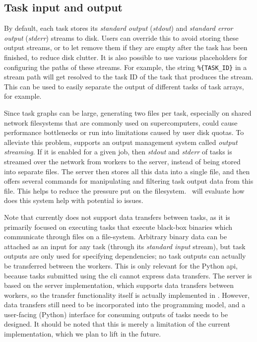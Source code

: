 \subsection{Task input and output}
By default, each \hyperqueue{} task stores its \emph{standard output} (\emph{stdout}) and
\emph{standard error output} (\emph{stderr}) streams to disk. Users can override this to avoid storing these output
streams, or to let \hq{} remove them if they are empty after the task has been
finished, to reduce disk clutter. It is also possible to use various placeholders for configuring
the paths of these streams. For example, the string \texttt{\%\{TASK\_ID\}} in a stream path will
get resolved to the task ID of the task that produces the stream. This can be used to easily
separate the output of different tasks of task arrays, for example.

Since task graphs can be large, generating two files per task, especially on shared network
filesystems that are commonly used on supercomputers, could cause performance bottlenecks or run
into limitations caused by user disk quotas. To alleviate this problem, \hq{}
supports an output management system called \emph{output streaming}. If it is enabled for a given
job, then \emph{stdout} and \emph{stderr} of tasks is streamed over the network
from workers to the server, instead of being stored into separate files. The server then stores all
this data into a single file, and then offers several commands for manipulating and filtering task
output data from this file. This helps to reduce the pressure put on the
filesystem.~ will evaluate how does this system help with potential
\gls{io} issues.


Note that \hyperqueue{} currently does not support data transfers between tasks, as it is
primarily focused on executing tasks that execute black-box binaries which communicate through
files on a file-system. Arbitrary binary data can be attached as an input for any task (through its
\emph{standard input} stream), but task outputs are only used for specifying dependencies; no
task outputs can actually be transferred between the workers. This is only relevant for the Python
\gls{api}, because tasks submitted using the \gls{cli} cannot express
data transfers. The \hq{} server is based on the \rsds{} server
implementation, which supports data transfers between workers, so the transfer functionality itself
is actually implemented in \hq{}. However, data transfers still need to be
incorporated into the \hyperqueue{} programming model, and a user-facing (Python)
interface for consuming outputs of tasks needs to be designed. It should be noted that this is
merely a limitation of the current implementation, which we plan to lift in the future.

